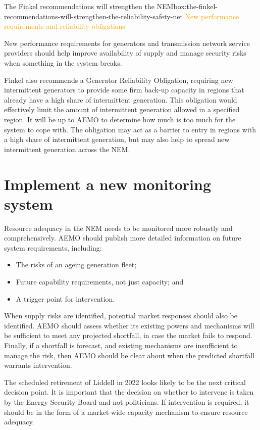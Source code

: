 \documentclass[FrontPage]{grattan}
\newenvironment{alphafootnotes}{}{}
\begin{document}
\begin{bigbox*}{The Finkel recommendations will strengthen the NEM}{box:the-finkel-recommendations-will-strengthen-the-reliability-safety-net}
\begin{alphafootnotes}
\textcolor{Orange}{New performance requirements and reliability obligations}

New performance requirements for generators and transmission network service providers should help improve availability of supply and manage security risks when something in the system breaks.

Finkel also recommends a Generator Reliability Obligation, requiring new intermittent generators to provide some firm back-up capacity in regions that already have a high share of intermittent generation. This obligation would effectively limit the amount of intermittent generation allowed in a specified region. It will be up to AEMO to determine how much is too much for the system to cope with. The obligation may act as a barrier to entry in regions with a high share of intermittent generation, but may also help to spread new intermittent generation across the NEM\@.
\end{alphafootnotes}
\end{bigbox*}


\section{Implement a new monitoring system}\label{sec:implement-new-monitoring-system}
Resource adequacy in the NEM needs to be monitored more robustly and comprehensively. AEMO should publish more detailed information on future system requirements, including:
\begin{itemize}
    \item The risks of an ageing generation fleet;
    \item Future capability requirements, not just capacity; and
    \item A trigger point for intervention.
\end{itemize}

When supply risks are identified, potential market responses should also be identified. AEMO should assess whether its existing powers and mechanisms will be sufficient to meet any projected shortfall, in case the market fails to respond. Finally, if a shortfall is forecast, and existing mechanisms are insufficient to manage the risk, then AEMO should be clear about when the predicted shortfall warrants intervention. 

The scheduled retirement of Liddell in 2022 looks likely to be the next critical decision point. It is important that the decision on whether to intervene is taken by the Energy Security Board and not politicians. If intervention is required, it should be in the form of a market-wide capacity mechanism to ensure resource adequacy.
\end{document}
